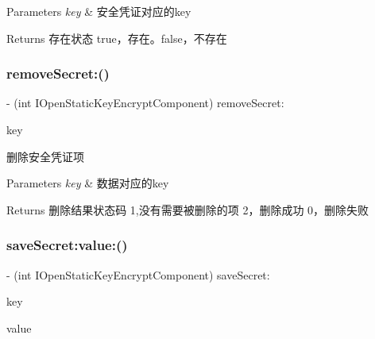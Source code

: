 \begin{DoxyParams}{Parameters}
{\em key} & 安全凭证对应的key\\
\hline
\end{DoxyParams}
\begin{DoxyReturn}{Returns}
存在状态 true，存在。false，不存在 
\end{DoxyReturn}
\mbox{\label{protocol_i_open_static_key_encrypt_component_01-p_adda2a40b5b5aaabbf9c574f100883453}} 
\subsubsection{\texorpdfstring{remove\+Secret\+:()}{removeSecret:()}}
{\footnotesize\ttfamily -\/ (int I\+Open\+Static\+Key\+Encrypt\+Component) remove\+Secret\+: \begin{DoxyParamCaption}\item[{(N\+S\+String $\ast$)}]{key }\end{DoxyParamCaption}}

删除安全凭证项


\begin{DoxyParams}{Parameters}
{\em key} & 数据对应的key\\
\hline
\end{DoxyParams}
\begin{DoxyReturn}{Returns}
删除结果状态码 1,没有需要被删除的项 2，删除成功 0，删除失败 
\end{DoxyReturn}
\mbox{\label{protocol_i_open_static_key_encrypt_component_01-p_affdd20bcddb0a63f5001df8d18443aa1}} 
\subsubsection{\texorpdfstring{save\+Secret\+:value\+:()}{saveSecret:value:()}}
{\footnotesize\ttfamily -\/ (int I\+Open\+Static\+Key\+Encrypt\+Component) save\+Secret\+: \begin{DoxyParamCaption}\item[{(N\+S\+String $\ast$)}]{key }\item[{value:(N\+S\+Data $\ast$)}]{value }\end{DoxyParamCaption}}

